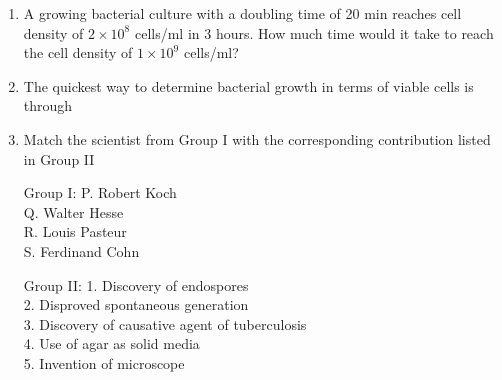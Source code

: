 \documentclass[journal,12pt,onecolumn]{IEEEtran}
\theoremstyle{remark}
\begin{document}
\begin{enumerate}
\item A growing bacterial culture with a doubling time of 20 min reaches cell density of $2 \times 10^8$ cells/ml in 3 hours. How much time would it take to reach the cell density of $1 \times 10^9$ cells/ml?

\hfill{}

\begin{enumerate}
\end{enumerate}

\item The quickest way to determine bacterial growth in terms of viable cells is through

\hfill{}

\begin{enumerate}
\end{enumerate}

\item Match the scientist from Group I with the corresponding contribution listed in Group II

\hfill{}

Group I:
P. Robert Koch \\
Q. Walter Hesse \\
R. Louis Pasteur \\
S. Ferdinand Cohn

Group II:
1. Discovery of endospores \\
2. Disproved spontaneous generation \\
3. Discovery of causative agent of tuberculosis \\
4. Use of agar as solid media \\
5. Invention of microscope

\begin{enumerate}
\end{enumerate}


\end{enumerate}
\end{document}
